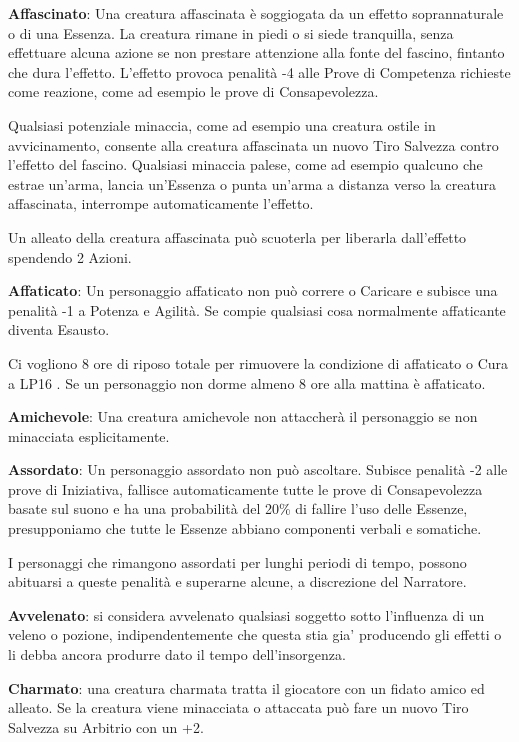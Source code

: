 \documentclass[a4paper,11pt,twoside,openany]{book}
\begin{document}
\textbf{Affascinato}: Una creatura affascinata è soggiogata da un effetto soprannaturale o di una Essenza. La creatura rimane in piedi o si siede tranquilla, senza effettuare alcuna azione se non prestare attenzione alla fonte del fascino, fintanto che dura l'effetto. L'effetto provoca penalità -4 alle Prove di Competenza richieste come reazione, come ad esempio le prove di Consapevolezza.

Qualsiasi potenziale minaccia, come ad esempio una creatura ostile in avvicinamento, consente alla creatura affascinata un nuovo Tiro Salvezza contro l'effetto del fascino. Qualsiasi minaccia palese, come ad esempio qualcuno che estrae un'arma, lancia un'Essenza o punta un'arma a distanza verso la creatura affascinata, interrompe automaticamente l'effetto.

Un alleato della creatura affascinata può scuoterla per liberarla dall'effetto spendendo 2 Azioni.

\textbf{Affaticato}: Un personaggio affaticato non può correre o Caricare e subisce una penalità -1 a Potenza e Agilità. Se compie qualsiasi cosa normalmente affaticante diventa Esausto.

Ci vogliono 8 ore di riposo totale per rimuovere la condizione di affaticato o Cura a LP16 . Se un personaggio non dorme almeno 8 ore alla mattina è affaticato.

\textbf{Amichevole}: Una creatura amichevole non attaccherà il personaggio se non minacciata esplicitamente.

\textbf{Assordato}: Un personaggio assordato non può ascoltare. Subisce penalità -2 alle prove di Iniziativa, fallisce automaticamente tutte le prove di Consapevolezza basate sul suono e ha una probabilità del 20\% di fallire l'uso delle Essenze, presupponiamo che tutte le Essenze abbiano componenti verbali e somatiche.

I personaggi che rimangono assordati per lunghi periodi di tempo, possono abituarsi a queste penalità e superarne alcune, a discrezione del Narratore.

\textbf{Avvelenato}: si considera avvelenato qualsiasi soggetto sotto l'influenza di un veleno o pozione, indipendentemente che questa stia gia' producendo gli effetti o li debba ancora produrre dato il tempo dell'insorgenza.

\textbf{Charmato}: una creatura charmata tratta il giocatore con un fidato amico ed alleato. Se la creatura viene minacciata o attaccata può fare un nuovo Tiro Salvezza su Arbitrio con un +2.
\end{document}
